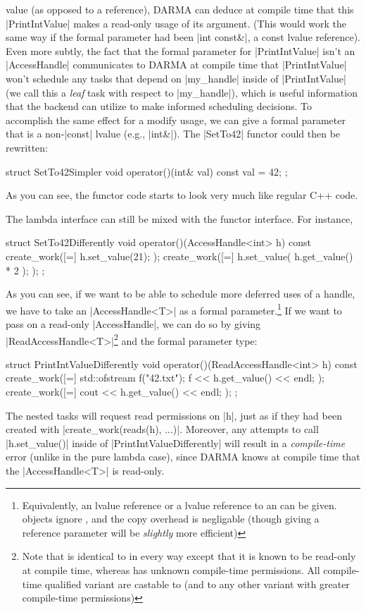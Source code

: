 value (as opposed to a reference), DARMA can deduce at compile time that this
|PrintIntValue| makes a read-only usage of its argument.  (This would work the
same way if the formal parameter had been |int const&|, a const lvalue
reference).  Even more subtly, the fact that the formal parameter for
|PrintIntValue| isn't an |AccessHandle| communicates to DARMA at compile time
that |PrintIntValue| won't schedule any tasks that depend on |my_handle| inside
of |PrintIntValue| (we call this a {\it leaf} task with respect to |my_handle|),
which is useful information that the backend can utilize to make informed
scheduling decisions.  To accomplish the same effect for a modify usage, we can
give a formal parameter that is a non-|const| lvalue (e.g., |int&|).  The
|SetTo42| functor could then be rewritten:
\begin{CppCodeNumb}
struct SetTo42Simpler {
  void operator()(int& val) const {
    val = 42;
  }
};
\end{CppCodeNumb}
As you can see, the functor code starts to look very much like regular C++ code.

The lambda interface can still be mixed with the functor interface.  For
instance,
\begin{CppCodeNumb}
struct SetTo42Differently {
  void operator()(AccessHandle<int> h) const {
    create_work([=]{
      h.set_value(21);
    });
    create_work([=]{
      h.set_value( h.get_value() * 2 );
    });
  }
};
\end{CppCodeNumb}
As you can see, if we want to be able to schedule more deferred uses of a
handle, we have to take an |AccessHandle<T>| as a formal
parameter.\footnote{Equivalently, an lvalue reference or a 
lvalue reference to an  can be given. 
 objects ignore , and the copy
overhead is negligable (though giving a reference parameter will be {\it
slightly} more efficient)}  If we want to pass on a read-only |AccessHandle|, we
can do so by giving |ReadAccessHandle<T>|\footnote{Note that
 is identical to 
in every way except that it is known to be read-only at compile time, whereas
 has unknown compile-time permissions.  All
compile-time qualified  variant are castable to
 (and to any other 
variant with greater compile-time permissions)} and the formal parameter type:
\begin{CppCodeNumb}
struct PrintIntValueDifferently {
  void operator()(ReadAccessHandle<int> h) const {
    create_work([=]{
      std::ofstream f("42.txt");
      f << h.get_value() << endl;
    });
    create_work([=]{
      cout << h.get_value() << endl;
    });
  }
};
\end{CppCodeNumb}
The nested tasks will request read permissions on |h|, just as if they had been
created with |create_work(reads(h), ...)|.  Moreover, any attempts to call
|h.set_value()| inside of |PrintIntValueDifferently| will result in a {\it
compile-time} error (unlike in the pure lambda case), since DARMA knows at
compile time that the |AccessHandle<T>| is read-only.  


